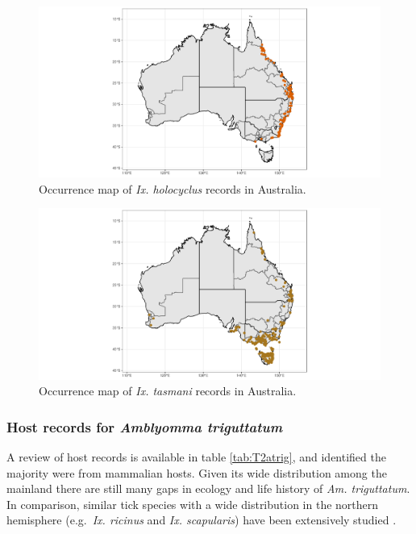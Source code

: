 \documentclass[a4paper, nobind]{templates/ociamthesis}
\begin{document}
\newpage

\begin{figure}
\includegraphics[width=0.95\linewidth]{figures/ms-figs/Ch2-map-ixhol} \caption[Map of \textit{Ix. holocyclus}.]{Occurrence map of \textit{Ix. holocyclus} records in Australia.}\label{fig:F2mapixhol}
\end{figure}

\begin{figure}
\includegraphics[width=0.95\linewidth]{figures/ms-figs/Ch2-map-ixtas} \caption[Map of \textit{Ix. tasmani}.]{Occurrence map of \textit{Ix. tasmani} records in Australia.}\label{fig:F2mapixtas}
\end{figure}

\newpage

\hypertarget{host-records-for-amblyomma-triguttatum}{%
\subsubsection{\texorpdfstring{Host records for \emph{Amblyomma triguttatum}}{Host records for Amblyomma triguttatum}}\label{host-records-for-amblyomma-triguttatum}}

A review of host records is available in table \ref{tab:T2atrig}, and identified the majority were from mammalian hosts.
Given its wide distribution among the mainland there are still many gaps in ecology and life history of \emph{Am. triguttatum}.
In comparison, similar tick species with a wide distribution in the northern hemisphere (e.g.~\emph{Ix. ricinus} and \emph{Ix. scapularis}) have been extensively studied \autocite{mihalcaRoleRodentsEcology2013,tietjenComparativeEvaluationNorthern2020}.
\end{document}
